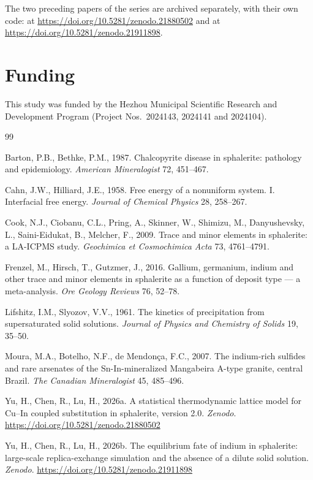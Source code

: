\documentclass[11pt,a4paper]{article}
\begin{document}
The two preceding papers of the series are archived separately, with their own
code: \citet{yu2026} at \url{https://doi.org/10.5281/zenodo.21880502} and
\citet{yu2026b} at \url{https://doi.org/10.5281/zenodo.21911898}.

\section*{Funding}
This study was funded by the Hezhou Municipal Scientific Research and
Development Program (Project Nos.\ 2024143, 2024141 and 2024104).

\begin{thebibliography}{99}
\itemsep2pt

Barton, P.B., Bethke, P.M., 1987. Chalcopyrite disease in sphalerite: pathology
and epidemiology. \textit{American Mineralogist} 72, 451--467.

Cahn, J.W., Hilliard, J.E., 1958. Free energy of a nonuniform system. I.
Interfacial free energy. \textit{Journal of Chemical Physics} 28, 258--267.

Cook, N.J., Ciobanu, C.L., Pring, A., Skinner, W., Shimizu, M., Danyushevsky,
L., Saini-Eidukat, B., Melcher, F., 2009. Trace and minor elements in
sphalerite: a LA-ICPMS study. \textit{Geochimica et Cosmochimica Acta} 73,
4761--4791.

Frenzel, M., Hirsch, T., Gutzmer, J., 2016. Gallium, germanium, indium and
other trace and minor elements in sphalerite as a function of deposit type ---
a meta-analysis. \textit{Ore Geology Reviews} 76, 52--78.

Lifshitz, I.M., Slyozov, V.V., 1961. The kinetics of precipitation from
supersaturated solid solutions. \textit{Journal of Physics and Chemistry of
Solids} 19, 35--50.

Moura, M.A., Botelho, N.F., de Mendon\c{c}a, F.C., 2007. The indium-rich
sulfides and rare arsenates of the Sn-In-mineralized Mangabeira A-type granite,
central Brazil. \textit{The Canadian Mineralogist} 45, 485--496.

Yu, H., Chen, R., Lu, H., 2026a. A statistical thermodynamic lattice model for
Cu--In coupled substitution in sphalerite, version 2.0. \textit{Zenodo}.
\url{https://doi.org/10.5281/zenodo.21880502}

Yu, H., Chen, R., Lu, H., 2026b. The equilibrium fate of indium in sphalerite:
large-scale replica-exchange simulation and the absence of a dilute solid
solution. \textit{Zenodo}. \url{https://doi.org/10.5281/zenodo.21911898}

\end{thebibliography}
\end{document}
